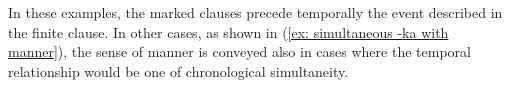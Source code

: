     \z
\z

In these examples, the marked clauses precede temporally the event described in the finite clause. In other cases, as shown in (\ref{ex: simultaneous -ka with manner}), the sense of manner is conveyed also in cases where the temporal relationship would be one of chronological simultaneity.

\ea\label{ex: simultaneous -ka with manner}

